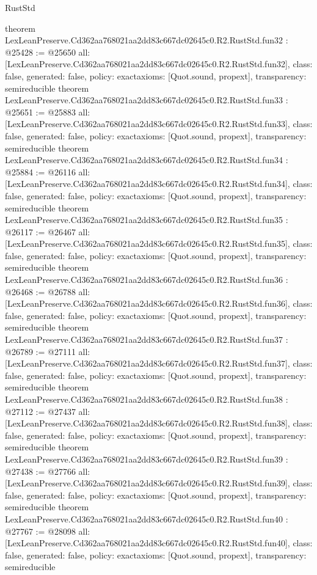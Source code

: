 \begin{lexlean}{RustStd}
\begin{coremodule}
{}
theorem LexLeanPreserve.Cd362aa768021aa2dd83c667dc02645c0.R2.RustStd.fun32 : @25428 := @25650 {
  all: [LexLeanPreserve.Cd362aa768021aa2dd83c667dc02645c0.R2.RustStd.fun32],
  class: false,
  generated: false,
  policy: exact{axioms: [Quot.sound, propext]},
  transparency: semireducible
}
theorem LexLeanPreserve.Cd362aa768021aa2dd83c667dc02645c0.R2.RustStd.fun33 : @25651 := @25883 {
  all: [LexLeanPreserve.Cd362aa768021aa2dd83c667dc02645c0.R2.RustStd.fun33],
  class: false,
  generated: false,
  policy: exact{axioms: [Quot.sound, propext]},
  transparency: semireducible
}
theorem LexLeanPreserve.Cd362aa768021aa2dd83c667dc02645c0.R2.RustStd.fun34 : @25884 := @26116 {
  all: [LexLeanPreserve.Cd362aa768021aa2dd83c667dc02645c0.R2.RustStd.fun34],
  class: false,
  generated: false,
  policy: exact{axioms: [Quot.sound, propext]},
  transparency: semireducible
}
theorem LexLeanPreserve.Cd362aa768021aa2dd83c667dc02645c0.R2.RustStd.fun35 : @26117 := @26467 {
  all: [LexLeanPreserve.Cd362aa768021aa2dd83c667dc02645c0.R2.RustStd.fun35],
  class: false,
  generated: false,
  policy: exact{axioms: [Quot.sound, propext]},
  transparency: semireducible
}
theorem LexLeanPreserve.Cd362aa768021aa2dd83c667dc02645c0.R2.RustStd.fun36 : @26468 := @26788 {
  all: [LexLeanPreserve.Cd362aa768021aa2dd83c667dc02645c0.R2.RustStd.fun36],
  class: false,
  generated: false,
  policy: exact{axioms: [Quot.sound, propext]},
  transparency: semireducible
}
theorem LexLeanPreserve.Cd362aa768021aa2dd83c667dc02645c0.R2.RustStd.fun37 : @26789 := @27111 {
  all: [LexLeanPreserve.Cd362aa768021aa2dd83c667dc02645c0.R2.RustStd.fun37],
  class: false,
  generated: false,
  policy: exact{axioms: [Quot.sound, propext]},
  transparency: semireducible
}
theorem LexLeanPreserve.Cd362aa768021aa2dd83c667dc02645c0.R2.RustStd.fun38 : @27112 := @27437 {
  all: [LexLeanPreserve.Cd362aa768021aa2dd83c667dc02645c0.R2.RustStd.fun38],
  class: false,
  generated: false,
  policy: exact{axioms: [Quot.sound, propext]},
  transparency: semireducible
}
theorem LexLeanPreserve.Cd362aa768021aa2dd83c667dc02645c0.R2.RustStd.fun39 : @27438 := @27766 {
  all: [LexLeanPreserve.Cd362aa768021aa2dd83c667dc02645c0.R2.RustStd.fun39],
  class: false,
  generated: false,
  policy: exact{axioms: [Quot.sound, propext]},
  transparency: semireducible
}
theorem LexLeanPreserve.Cd362aa768021aa2dd83c667dc02645c0.R2.RustStd.fun40 : @27767 := @28098 {
  all: [LexLeanPreserve.Cd362aa768021aa2dd83c667dc02645c0.R2.RustStd.fun40],
  class: false,
  generated: false,
  policy: exact{axioms: [Quot.sound, propext]},
  transparency: semireducible
}
\end{coremodule}
\end{lexlean}
